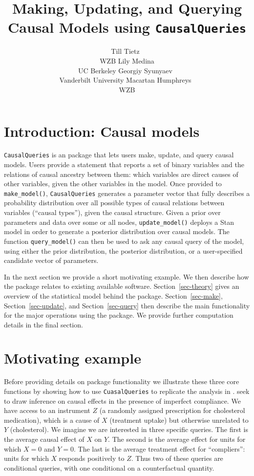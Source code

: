 \documentclass[
  11pt,
  article]{jss}
\author{Till Tietz~\orcidlink{0000-0002-2916-9059}\\WZB \And Lily
Medina\\UC Berkeley \AND Georgiy
Syunyaev~\orcidlink{0000-0002-4391-6313}\\Vanderbilt
University \And Macartan Humphreys~\orcidlink{0000-0001-7029-2326}\\WZB}
\title{Making, Updating, and Querying Causal Models using
\texttt{CausalQueries}}
\begin{document}
\maketitle
\hypertarget{sec-intro}{%
\section{Introduction: Causal models}\label{sec-intro}}

\texttt{CausalQueries} is an  package that lets users make,
update, and query causal models. Users provide a statement that reports
a set of binary variables and the relations of causal ancestry between
them: which variables are direct causes of other variables, given the
other variables in the model. Once provided to \texttt{make\_model()},
\texttt{CausalQueries} generates a parameter vector that fully describes
a probability distribution over all possible types of causal relations
between variables (``causal types''), given the causal structure. Given
a prior over parameters and data over some or all nodes,
\texttt{update\_model()} deploys a Stan \citep{carpenter_stan_2017}
model in order to generate a posterior distribution over causal models.
The function \texttt{query\_model()} can then be used to ask any causal
query of the model, using either the prior distribution, the posterior
distribution, or a user-specified candidate vector of parameters.

In the next section we provide a short motivating example. We then
describe how the package relates to existing available software.
Section~\ref{sec-theory} gives an overview of the statistical model
behind the package. Section~\ref{sec-make}, Section~\ref{sec-update},
and Section~\ref{sec-query} then describe the main functionality for the
major operations using the package. We provide further computation
details in the final section.

\hypertarget{motivating-example}{%
\section{Motivating example}\label{motivating-example}}

Before providing details on package functionality we illustrate these
three core functions by showing how to use \texttt{CuasalQueries} to
replicate the analysis in \citeauthor{chickering_clinicians_1996}
\citetext{\citeyear{chickering_clinicians_1996}; \citealp[see
also][]{humphreys_integrated_2023}}. \citet{chickering_clinicians_1996}
seek to draw inference on causal effects in the presence of imperfect
compliance. We have access to an instrument \(Z\) (a randomly assigned
prescription for cholesterol medication), which is a cause of \(X\)
(treatment uptake) but otherwise unrelated to \(Y\) (cholesterol). We
imagine we are interested in three specific queries. The first is the
average causal effect of \(X\) on \(Y\). The second is the average
effect for units for which \(X=0\) and \(Y=0\). The last is the average
treatment effect for ``compliers'': units for which \(X\) responds
positively to \(Z\). Thus two of these queries are conditional queries,
with one conditional on a counterfactual quantity.
\end{document}
